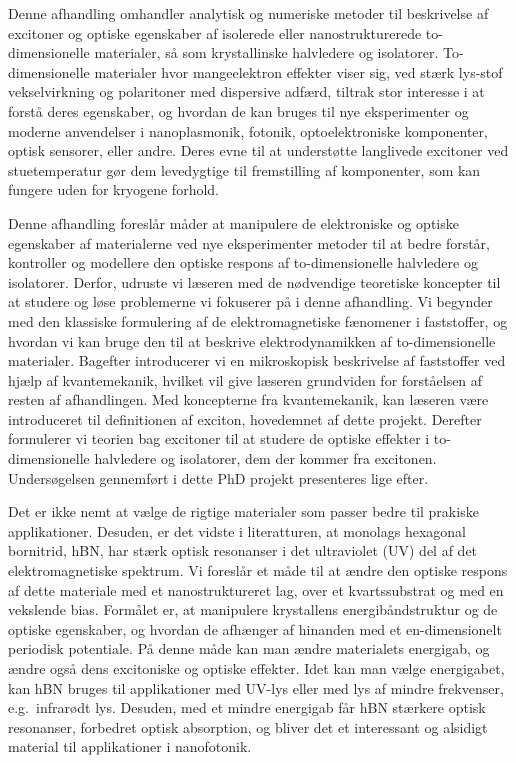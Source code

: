 
%

Denne afhandling omhandler analytisk og numeriske metoder til beskrivelse af excitoner og optiske egenskaber af isolerede eller nanostrukturerede to-dimensionelle materialer, så som krystallinske halvledere og isolatorer.
To-dimensionelle materialer hvor mangeelektron effekter viser sig, ved stærk lys-stof vekselvirkning og polaritoner med dispersive adfærd,
tiltrak stor interesse i at forstå deres egenskaber, og hvordan de kan bruges til nye eksperimenter og moderne anvendelser i nanoplasmonik, fotonik, optoelektroniske komponenter, optisk sensorer, eller andre.
Deres evne til at understøtte langlivede excitoner ved stuetemperatur gør dem levedygtige til fremstilling af komponenter, som kan fungere uden for kryogene forhold.

Denne afhandling foreslår måder at manipulere de elektroniske og optiske egenskaber af materialerne ved nye eksperimenter metoder til at bedre forstår, kontroller og modellere den optiske respons af to-dimensionelle halvledere og isolatorer.
Derfor, udruste  vi læseren med de nødvendige teoretiske koncepter til at studere og løse problemerne vi fokuserer på i denne afhandling.
Vi begynder med den klassiske formulering af de elektromagnetiske fænomener i faststoffer, og hvordan vi kan bruge den til at beskrive elektrodynamikken af to-dimensionelle materialer.
Bagefter introducerer vi en mikroskopisk beskrivelse af faststoffer ved hjælp af kvantemekanik, hvilket vil give læseren grundviden for forståelsen af resten af afhandlingen.
Med koncepterne fra kvantemekanik, kan læseren være introduceret til definitionen af exciton, hovedemnet af dette projekt.
Derefter formulerer vi teorien bag excitoner til at studere de optiske effekter i to-dimensionelle halvledere og isolatorer, dem der kommer fra excitonen.
Undersøgelsen gennemført i dette PhD projekt presenteres lige efter.

Det er ikke nemt at vælge de rigtige materialer som passer bedre til prakiske applikationer.
Desuden, er det vidste i literatturen, at monolags hexagonal bornitrid, hBN, har stærk optisk resonanser i det ultraviolet (UV) del af det elektromagnetiske spektrum.
Vi foreslår et måde til at ændre den optiske respons af dette materiale med et nanostruktureret lag, over et kvartssubstrat og med en vekslende bias.
Formålet er, at manipulere krystallens energibåndstruktur og de optiske egenskaber, og hvordan de afhænger af hinanden med et en-dimensionelt periodisk potentiale.
På denne måde kan man ændre materialets energigab, og ændre også dens excitoniske og optiske effekter.
Idet kan man vælge energigabet, kan hBN bruges til applikationer med UV-lys eller med lys af mindre frekvenser, e.g.~infrarødt lys.
Desuden, med et mindre energigab får hBN stærkere optisk resonanser, forbedret optisk absorption, og bliver det et interessant og alsidigt material til applikationer i nanofotonik.

